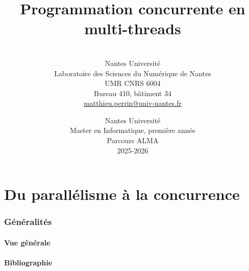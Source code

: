 
\title[Programmation concurrente en multi-threads]{Programmation concurrente en multi-threads}

\author[Matthieu Perrin]{
  \\[2mm]
  Nantes Université\\
  Laboratoire des Sciences du Numérique de Nantes \\
  UMR CNRS 6004\\
  Bureau 410, bâtiment 34 \\
  \url{matthieu.perrin@univ-nantes.fr}\\
}

\date{
  Nantes Université\\
  Master en Informatique, première année\\
  Parcours ALMA\\
  2025-2026
}



\begin{frame}
  \titlepage
\end{frame}


\part{Du parallélisme à la concurrence}
 
\section{Généralités}
 
\subsection{Vue générale}

 
\subsection{Bibliographie}

 

